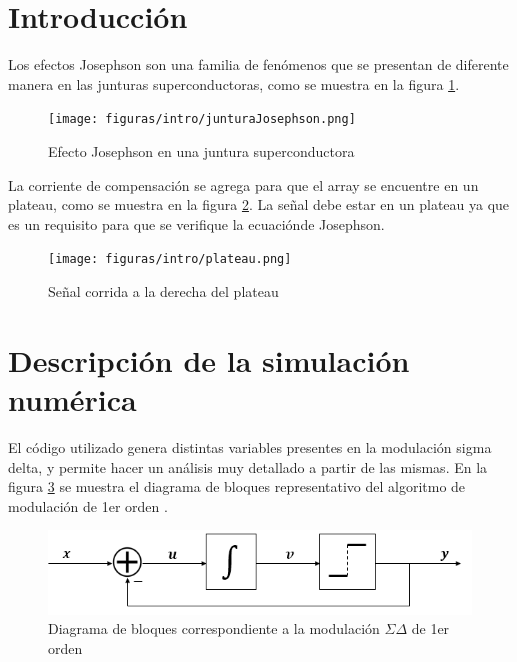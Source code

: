\documentclass[twoside]{article}
\begin{document}
\begin{multicols}{2}

\section{Introducción}

Los efectos Josephson son una familia de fenómenos que se presentan de diferente manera en las junturas superconductoras, como se muestra en la figura \ref{fig:intro_junturaJosephson}. 

\begin{figure}[H]
    \centering
    \texttt{[image: figuras/intro/junturaJosephson.png]}
    \caption{Efecto Josephson en una juntura superconductora}
    \label{fig:intro_junturaJosephson}
    \end{figure}


La corriente de compensación se agrega para que el array se encuentre en un plateau, como se muestra en la figura \ref{fig:intro_plateau}. La señal debe estar en un plateau ya que es un requisito para que se verifique la ecuaciónde Josephson.

\begin{figure}[H]
    \centering
    \texttt{[image: figuras/intro/plateau.png]}
    \caption{Señal corrida a la derecha del plateau}
    \label{fig:intro_plateau}
    \end{figure}

\section{Descripción de la simulación numérica}

El código utilizado genera distintas variables presentes en la modulación sigma delta, y permite hacer un análisis muy detallado a partir de las mismas. En la figura \ref{fig:bloques} se muestra el diagrama de bloques representativo del algoritmo de modulación de 1er orden \cite{script}.

\begin{figure}[H]
\centering
\includegraphics[width=\linewidth]{figuras/bloques_1erorden.png}
\caption{Diagrama de bloques correspondiente a la modulación $\Sigma\Delta$ de 1er orden}
\label{fig:bloques}
\end{figure}


\end{multicols}
\end{document}
